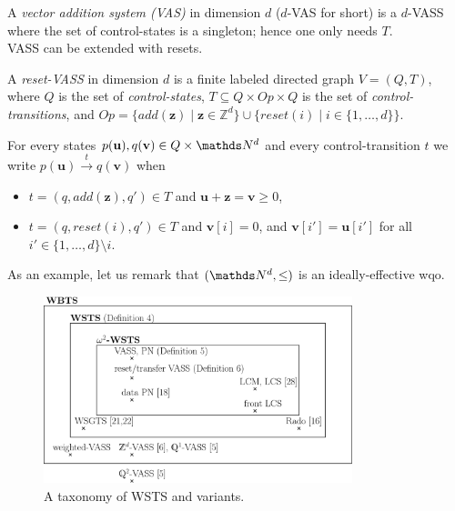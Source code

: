 \documentclass[runningheads]{llncs}
\begin{document}
A {\em vector addition system (VAS)} in dimension $d$ ($d$-VAS for short) is a $d$-VASS where the set of control-states is a singleton; hence one only needs $T$.\\

VASS can be extended with resets.

\begin{definition}
A {\em reset-VASS} in dimension $d$ 
 is a finite 
labeled directed graph $V = (Q,T)$, where $Q$ is the set of {\em control-states}, 
$T \subseteq Q \times Op \times Q$
is the set of {\em control-transitions}, and $Op = \{ add(\textbf{z}) \mid \textbf{z} \in \mathds{Z}^d\} \cup 
		\{ reset(i) \mid i \in \{1,\ldots,d\} \}$.
\end{definition}

For every states $p(\textbf{u}), q(\textbf{v}) \in Q \times \N^d$ and every control-transition $t$ we write
$p(\textbf{u}) \xrightarrow{t} q(\textbf{v})$ when 
\begin{samepage}\begin{itemize}
\item  $t = (q,add(\textbf{z}),q') \in T$
and $\textbf{u}+\textbf{z} = \textbf{v} \geq 0$,
\item $t = (q,reset(i),q') \in T$ 
and
$\textbf{v}[i] = 0$, and $\textbf{v}[i'] = \textbf{u}[i']$ for all $i' \in \{1,\ldots, d\} \setminus i$.
\end{itemize} \end{samepage}

As an example, let us remark that $(\N^d,\leq)$ is an ideally-effective wqo.

 \begin{center}
	\begin{figure}
	\hspace{1.2cm}
\includegraphics[width=0.80\textwidth]{WSTS_taxonomy_large}
	\caption{A taxonomy of WSTS and variants.}
	\end{figure}
\end{center}
\end{document}
